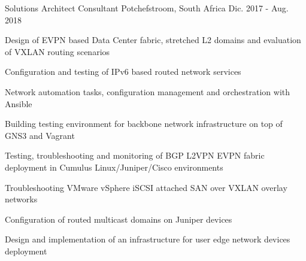 \begin{cventries}
\vspace{0mm}
\cventry
{Solutions Architect Consultant} %
{} %
{Potchefstroom, South Africa} %
{Dic. 2017 - Aug. 2018} %
{ %
\begin{cvitems}
\item {Design of EVPN based Data Center fabric, stretched L2 domains and evaluation of VXLAN routing scenarios}
\item {Configuration and testing of IPv6 based routed network services}
\item {Network automation tasks, configuration management and orchestration with Ansible}
\item {Building testing environment for backbone network infrastructure on top of GNS3 and Vagrant}
\item {Testing, troubleshooting and monitoring of BGP L2VPN EVPN fabric deployment in Cumulus Linux/Juniper/Cisco environments}
\item {Troubleshooting VMware vSphere iSCSI attached SAN over VXLAN overlay networks}
\item {Configuration of routed multicast domains on Juniper devices}
\item {Design and implementation of an infrastructure for user edge network devices deployment}
\end{cvitems}
}


\end{cventries}
